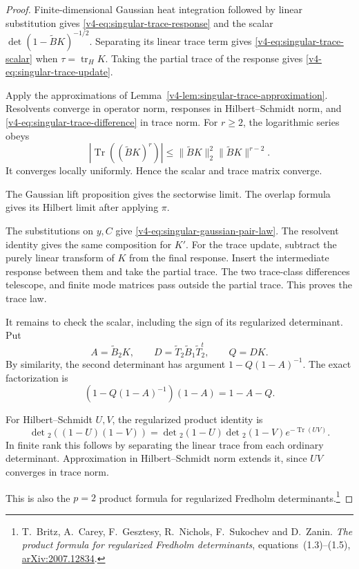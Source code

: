 \begin{proof}
Finite-dimensional Gaussian heat integration
followed by linear substitution gives
\eqref{v4-eq:singular-trace-response} and the
scalar \(\det(1-\widetilde BK)^{-1/2}\).
Separating its linear trace term gives
\eqref{v4-eq:singular-trace-scalar} when
\(\tau=\operatorname{tr}_H K\).
Taking the partial trace of the response
gives \eqref{v4-eq:singular-trace-update}.

Apply the approximations of
Lemma~\ref{v4-lem:singular-trace-approximation}.
Resolvents converge in operator norm,
responses in Hilbert--Schmidt norm, and
\eqref{v4-eq:singular-trace-difference}
in trace norm.
For \(r\geq2\), the logarithmic series obeys
\[
 |\operatorname{Tr}((\widetilde BK)^r)|
       \leq\|\widetilde BK\|_2^2\|\widetilde BK\|^{r-2}.
\]
It converges locally uniformly.
Hence the scalar and trace matrix converge.

The Gaussian lift proposition gives the
sectorwise limit. The overlap formula
gives its Hilbert limit after applying \(\pi\).

The substitutions on \(y,C\) give
\eqref{v4-eq:singular-gaussian-pair-law}.
The resolvent identity gives the same
composition for \(K'\).
For the trace update, subtract the
purely linear transform of \(K\) from
the final response.
Insert the intermediate response between
them and take the partial trace.
The two trace-class differences telescope,
and finite mode matrices pass outside
the partial trace. This proves the trace law.

It remains to check the scalar, including
the sign of its regularized determinant.
Put
\[
 A=\widetilde B_2K,\qquad
 D=\widetilde T_2\widetilde B_1\widetilde T_2^t,\qquad Q=DK.
\]
By similarity, the second determinant
has argument \(1-Q(1-A)^{-1}\).
The exact factorization is
\[
                  (1-Q(1-A)^{-1})(1-A)=1-A-Q.
\]

For Hilbert--Schmidt \(U,V\), the regularized
product identity is
\[
 \det{}_2((1-U)(1-V))
       =\det{}_2(1-U)\det{}_2(1-V)e^{-\operatorname{Tr}(UV)}.
\]
In finite rank this follows by separating
the linear trace from each ordinary determinant.
Approximation in Hilbert--Schmidt norm extends
it, since \(UV\) converges in trace norm.

This is also the \(p=2\) product formula
for regularized Fredholm determinants.\footnote{
T.~Britz, A.~Carey, F.~Gesztesy, R.~Nichols,
F.~Sukochev and D.~Zanin.
\emph{The product formula for regularized Fredholm determinants},
equations~(1.3)--(1.5),
\href{https://arxiv.org/abs/2007.12834}{arXiv:2007.12834}.}


\end{proof}
